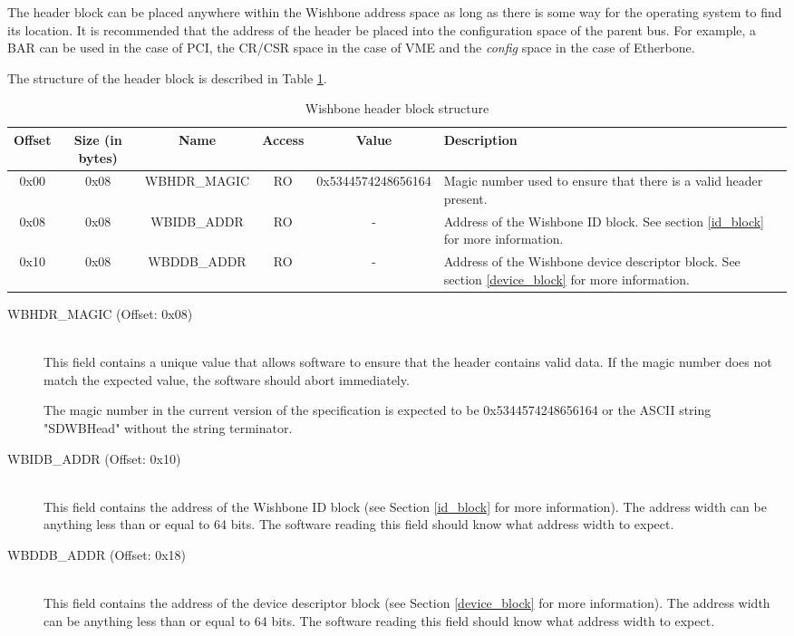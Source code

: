 \documentclass{article}
\begin{document}
The header block can be placed anywhere within the Wishbone address space
as long as there is some way for the operating system to find its location.
It is recommended that the address of the header be placed into the configuration
space of the parent bus. For example, a BAR can be used in the case of PCI,
the CR/CSR space in the case of VME and the \emph{config} space in the case
of Etherbone.

The structure of the header block is described in Table \ref{hdr_block_struct}.

\begin{center}
	\begin{savenotes}
	\begin{table}[!ht]\footnotesize
	\caption{Wishbone header block structure}\label{hdr_block_struct}\centering
	\begin{tabular}{| c | c | c | c | c | p{5cm} |} \hline
	Offset & Size (in bytes) & Name & Access & Value & Description \\ \hline
	0x00 & 0x08 & WBHDR\_MAGIC & RO & 0x5344574248656164 & Magic number used to ensure that there is a valid header present. \\ \hline
	0x08 & 0x08 & WBIDB\_ADDR & RO & - & Address of the Wishbone ID block. See section \ref{id_block} for more information. \\ \hline
	0x10 & 0x08 & WBDDB\_ADDR & RO & - & Address of the Wishbone device descriptor block. See section \ref{device_block} for more information. \\ \hline
	\end{tabular}
	\end{table}
	\end{savenotes}
\end{center}

\begin{description}
\item[WBHDR\_MAGIC (Offset: 0x08)] \hfill \\
This field contains a unique value that allows software to ensure that
the header contains valid data. If the magic number does not match the
expected value, the software should abort immediately.

The magic number in the current version of the specification is expected to
be 0x5344574248656164 or the ASCII string "SDWBHead" without the string
terminator.

\item[WBIDB\_ADDR (Offset: 0x10)] \hfill \\
This field contains the address of the Wishbone ID block (see Section \ref{id_block}
for more information). The address width can be anything less than or equal
to 64 bits. The software reading this field should know what address width to
expect.

\item[WBDDB\_ADDR (Offset: 0x18)] \hfill \\
This field contains the address of the device descriptor block (see Section
\ref{device_block} for more information). The address width can be anything
less than or equal to 64 bits. The software reading this field should know
what address width to expect.
\end{description}
\end{document}
